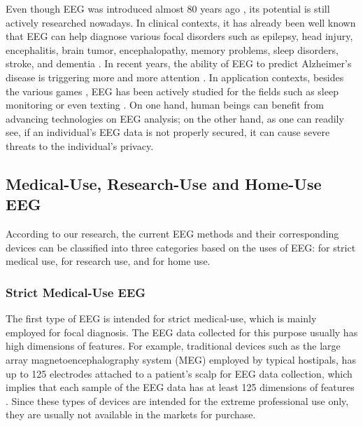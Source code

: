 \indent Even though EEG was introduced almost 80 years ago \cite{swartz1998advantages}, its potential is still actively researched nowadays. In clinical contexts, it has already been well known that EEG can help diagnose various focal disorders such as epilepsy, head injury, encephalitis, brain tumor, encephalopathy, memory problems, sleep disorders, stroke, and dementia \cite{eegdiagnosis}. In recent years, the ability of EEG to predict Alzheimer's disease is triggering more and more attention \cite{dauwels2010diagnosis}. In application contexts, besides the various games \cite{coyle2011eeg}, EEG has been actively studied for the fields such as sleep monitoring \cite{nakamura2017automatic} or even texting \cite{zhang2017converting}. On one hand, human beings can benefit from advancing technologies on EEG analysis; on the other hand, as one can readily see, if an individual's EEG data is not properly secured, it can cause severe threats to the individual's privacy.

\subsection{Medical-Use, Research-Use and Home-Use EEG}
According to our research, the current EEG methods and their corresponding devices can be classified into three categories based on the uses of EEG: for strict medical use, for research use, and for home use.

\subsubsection{Strict Medical-Use EEG}
The first type of EEG is intended for strict medical-use, which is mainly employed for focal diagnosis. The EEG data collected for this purpose usually has high dimensions of features. For example, traditional devices such as the large array magnetoencephalography system (MEG) employed by typical hostipals, has up to 125 electrodes attached to a patient's scalp for EEG data collection, which implies that each sample of the EEG data has at least 125 dimensions of features \cite{lantz2003epileptic}. Since these types of devices are intended for the extreme professional use only, they are usually not available in the markets for purchase.

